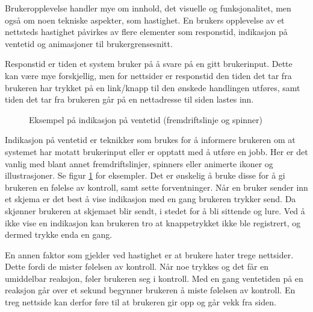 Brukeropplevelse handler mye om innhold, det visuelle og funksjonalitet, men også om noen tekniske aspekter, som hastighet. En brukers opplevelse av et nettsteds hastighet påvirkes av flere elementer som responstid, indikasjon på ventetid og animasjoner til brukergrensesnitt.

Responstid er tiden et system bruker på å svare på en gitt brukerinput.
Dette kan være mye forskjellig, men for nettsider er responstid den tiden det tar fra brukeren har trykket på en link/knapp til den ønskede handlingen utføres, samt tiden det tar fra brukeren går på en nettadresse til siden lastes inn.

\begin{figure}[H]
    \centering
    \caption{Eksempel på indikasjon på ventetid (fremdriftslinje og spinner)}
    \label{fig:analysis-loading-indicators}
\end{figure}

Indikasjon på ventetid er teknikker som brukes for å informere brukeren om at systemet har motatt brukerinput eller er opptatt med å utføre en jobb. Her er det vanlig med blant annet fremdriftslinjer, spinners eller animerte ikoner og illustrasjoner. Se figur \ref{fig:analysis-loading-indicators} for eksempler.
Det er ønskelig å bruke disse for å gi brukeren en følelse av kontroll, samt sette forventninger. Når en bruker sender inn et skjema er det best å vise indikasjon med en gang brukeren trykker send. Da skjønner brukeren at skjemaet blir sendt, i stedet for å bli sittende og lure. Ved å ikke vise en indikasjon kan brukeren tro at knappetrykket ikke ble registrert, og dermed trykke enda en gang. 

En annen faktor som gjelder ved hastighet er at brukere hater trege nettsider. Dette fordi de mister følelsen av kontroll. Når noe trykkes og det får en umiddelbar reaksjon, føler brukeren seg i kontroll. Med en gang ventetiden på en reaksjon går over et sekund begynner brukeren å miste følelsen av kontroll. En treg nettside kan derfor føre til at brukeren gir opp og går vekk fra siden.


